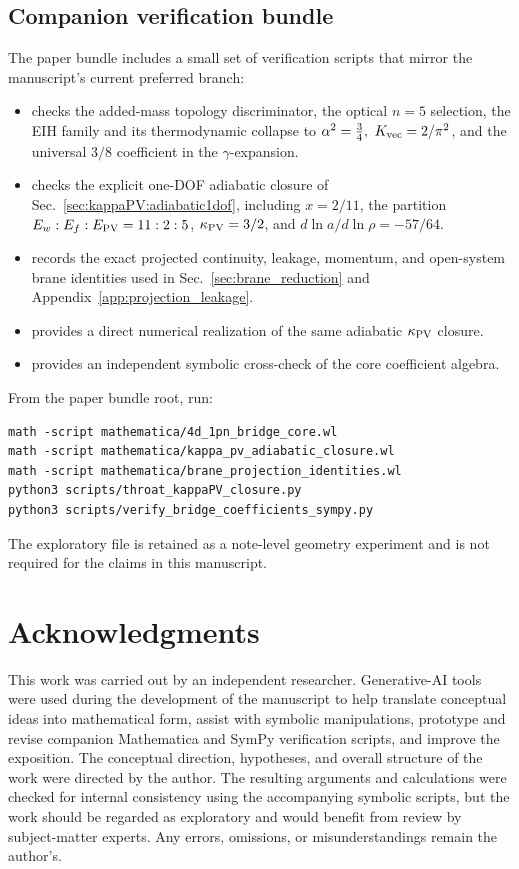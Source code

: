 \documentclass[11pt]{article}
\begin{document}
\subsection*{Companion verification bundle}
The paper bundle includes a small set of verification scripts that mirror the
manuscript's current preferred branch:
\begin{itemize}
  \item {} checks the added-mass
  topology discriminator, the optical \(n=5\) selection, the EIH family and
  its thermodynamic collapse to \(\alpha^2=\tfrac34,\ K_{\rm vec}=2/\pi^2\),
  and the universal \(3/8\) coefficient in the \(\gamma\)-expansion.
  \item {} checks the explicit
  one-DOF adiabatic closure of Sec.~\ref{sec:kappaPV:adiabatic1dof},
  including \(x=2/11\), the partition \(E_w:E_f:E_{\rm PV}=11:2:5\),
  \(\kappa_{\rm PV}=3/2\), and \(d\ln a/d\ln\rho=-57/64\).
  \item {} records the exact
  projected continuity, leakage, momentum, and open-system brane identities
  used in Sec.~\ref{sec:brane_reduction} and
  Appendix~\ref{app:projection_leakage}.
  \item {} provides a direct numerical
  realization of the same adiabatic \(\kappa_{\rm PV}\) closure.
  \item {} provides an
  independent symbolic cross-check of the core coefficient algebra.
\end{itemize}
From the paper bundle root, run:
\begin{verbatim}
math -script mathematica/4d_1pn_bridge_core.wl
math -script mathematica/kappa_pv_adiabatic_closure.wl
math -script mathematica/brane_projection_identities.wl
python3 scripts/throat_kappaPV_closure.py
python3 scripts/verify_bridge_coefficients_sympy.py
\end{verbatim}
The exploratory file  is retained as a
note-level geometry experiment and is not required for the claims in this
manuscript.

\section*{Acknowledgments}
This work was carried out by an independent researcher. Generative-AI tools were used during the development of the manuscript to help translate conceptual ideas into mathematical form, assist with symbolic manipulations, prototype and revise companion Mathematica and SymPy verification scripts, and improve the exposition. The conceptual direction, hypotheses, and overall structure of the work were directed by the author. The resulting arguments and calculations were checked for internal consistency using the accompanying symbolic scripts, but the work should be regarded as exploratory and would benefit from review by subject-matter experts. Any errors, omissions, or misunderstandings remain the author’s.
\end{document}
